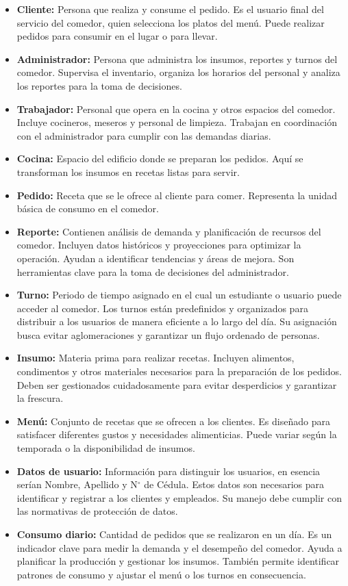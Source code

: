 \documentclass[12pt]{article}
\begin{document}
\begin{itemize}
	\item \textbf{Cliente:} Persona que realiza y consume el pedido. Es el usuario final del servicio del comedor, quien selecciona los platos del menú. Puede realizar pedidos para consumir en el lugar o para llevar.
	\item \textbf{Administrador:} Persona que administra los insumos, reportes y turnos del comedor. Supervisa el inventario, organiza los horarios del personal y analiza los reportes para la toma de decisiones.
	\item \textbf{Trabajador:} Personal que opera en la cocina y otros espacios del comedor. Incluye cocineros, meseros y personal de limpieza. Trabajan en coordinación con el administrador para cumplir con las demandas diarias.
	\item \textbf{Cocina:} Espacio del edificio donde se preparan los pedidos. Aquí se transforman los insumos en recetas listas para servir.
	\item \textbf{Pedido:} Receta que se le ofrece al cliente para comer. Representa la unidad básica de consumo en el comedor.
	\item \textbf{Reporte:} Contienen análisis de demanda y planificación de recursos del comedor. Incluyen datos históricos y proyecciones para optimizar la operación. Ayudan a identificar tendencias y áreas de mejora. Son herramientas clave para la toma de decisiones del administrador.
    \item \textbf{Turno:} Periodo de tiempo asignado en el cual un estudiante o usuario puede acceder al comedor. Los turnos están predefinidos y organizados para distribuir a los usuarios de manera eficiente a lo largo del día. Su asignación busca evitar aglomeraciones y garantizar un flujo ordenado de personas.
	\item \textbf{Insumo:} Materia prima para realizar recetas. Incluyen alimentos, condimentos y otros materiales necesarios para la preparación de los pedidos. Deben ser gestionados cuidadosamente para evitar desperdicios y garantizar la frescura.
	\item \textbf{Menú:} Conjunto de recetas que se ofrecen a los clientes. Es diseñado para satisfacer diferentes gustos y necesidades alimenticias. Puede variar según la temporada o la disponibilidad de insumos.
	\item \textbf{Datos de usuario:} Información para distinguir los usuarios, en esencia serían Nombre, Apellido y N$^{\circ}$ de Cédula. Estos datos son necesarios para identificar y registrar a los clientes y empleados. Su manejo debe cumplir con las normativas de protección de datos.
	\item \textbf{Consumo diario:} Cantidad de pedidos que se realizaron en un día. Es un indicador clave para medir la demanda y el desempeño del comedor. Ayuda a planificar la producción y gestionar los insumos. También permite identificar patrones de consumo y ajustar el menú o los turnos en consecuencia.
\end{itemize}
\end{document}
